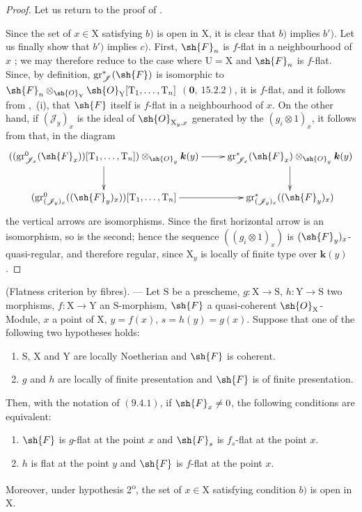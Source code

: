 \begin{proof}
Let us return to the proof of .

Since the set of $x\in\mathrm{X}$ satisfying $b)$ is open in $\mathrm{X}$, it is clear that $b)$ implies $b')$. Let us finally show that $b')$ implies $c)$. First, $\sh{F}_n$ is $f$-flat in a neighbourhood of $x$ ; we may therefore reduce to the case where $\mathrm{U}=\mathrm{X}$ and $\sh{F}_n$ is $f$-flat. Since, by definition, $\operatorname{gr}^*_\mathscr{J}(\sh{F})$ is isomorphic to $\sh{F}_n\otimes_{\sh{O}_\mathrm{Y}}\sh{O}_\mathrm{Y}[\mathrm{T}_1,\ldots,\mathrm{T}_n]$ $(\mathbf{0},~15.2.2)$, it is $f$-flat, and it follows from ,~(i), that $\sh{F}$ itself is $f$-flat in a neighbourhood of $x$. On the other hand, if $(\mathscr{J}_y)_x$ is the ideal of $\sh{O}_{\mathrm{X}_y,x}$ generated by the $(g_i\otimes 1)_x$, it follows from  that, in the diagram
\[
\xymatrix{
  ((\operatorname{gr}^0_{\mathscr{J}_x}(\sh{F}_x))[\mathrm{T}_1,\ldots,\mathrm{T}_n])\otimes_{\sh{O}_y}\boldsymbol{k}(y) \ar[r] \ar[d] & \operatorname{gr}^*_{\mathscr{J}_x}(\sh{F}_x)\otimes_{\sh{O}_y}\boldsymbol{k}(y) \ar[d] \\
  (\operatorname{gr}^0_{(\mathscr{J}_y)_x}((\sh{F}_y)_x))[\mathrm{T}_1,\ldots,\mathrm{T}_n] \ar[r] & \operatorname{gr}^*_{(\mathscr{J}_y)_x}((\sh{F}_y)_x)
}
\]
the vertical arrows are isomorphisms. Since the first horizontal arrow is an isomorphism, so is the second; hence the sequence $((g_i\otimes 1)_x)$ is $(\sh{F}_y)_x$-quasi-regular, and therefore regular, since $\mathrm{X}_y$ is locally of finite type over $\boldsymbol{k}(y)$.
\end{proof}

\begin{theorem}[11.3.10]
\label{IV.11.3.10}
(Flatness criterion by fibres). --- Let $\mathrm{S}$ be a prescheme, $g:\mathrm{X}\to\mathrm{S}$, $h:\mathrm{Y}\to\mathrm{S}$ two morphisms, $f:\mathrm{X}\to\mathrm{Y}$ an $\mathrm{S}$-morphism, $\sh{F}$ a quasi-coherent $\sh{O}_\mathrm{X}$-Module, $x$ a point of $\mathrm{X}$, $y=f(x)$, $s=h(y)=g(x)$. Suppose that one of the following two hypotheses holds:
\begin{enumerate}[label=\arabic{enumi}\textsuperscript{o}]
  \item $\mathrm{S}$, $\mathrm{X}$ and $\mathrm{Y}$ are locally Noetherian and $\sh{F}$ is coherent.
  \item $g$ and $h$ are locally of finite presentation and $\sh{F}$ is of finite presentation.
\end{enumerate}
Then, with the notation of $(9.4.1)$, if $\sh{F}_x\neq 0$, the following conditions are equivalent:
\begin{enumerate}[label=\emph{\alph*)}]
  \item $\sh{F}$ is $g$-flat at the point $x$ and $\sh{F}_s$ is $f_s$-flat at the point $x$.
  \item $h$ is flat at the point $y$ and $\sh{F}$ is $f$-flat at the point $x$.
\end{enumerate}
Moreover, under hypothesis 2\textsuperscript{o}, the set of $x\in\mathrm{X}$ satisfying condition $b)$ is open in $\mathrm{X}$.
\end{theorem}

